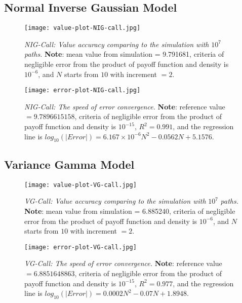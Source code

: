 \subsection{Normal Inverse Gaussian Model}
\begin{figure}[H]
    \centering
    \texttt{[image: value-plot-NIG-call.jpg]}
     \caption[\emph{NIG-Call: Value accuracy comparing to the simulation with} $10^7$ \emph{paths.}]{\emph{NIG-Call: Value accuracy comparing to the simulation with} $10^7$ \emph{paths.} \textbf{Note}: mean value from simulation = 9.791681, criteria of negligible error from the product of payoff function and density is $10^{-6}$, and $N$ starts from $10$  with increment $=2$.}

    \label{fig:label}
\end{figure}
\begin{figure}[H]
    \centering
    \texttt{[image: error-plot-NIG-call.jpg]}
    \caption[\emph{NIG-Call: The speed of error convergence.}]{\emph{NIG-Call: The speed of error convergence.} \textbf{Note}: reference value $=9.7896615158$, criteria of negligible error from the product of payoff function and density is $10^{-15}$, $R^2=0.991$, and the regression line is $log_{10}\left(|Error|\right) = 6.167\times 10^{-6}N^2-0.0562N+5.1576$.}
 
    \label{fig:label}
\end{figure}



\subsection{Variance Gamma Model}
\begin{figure}[H]
    \centering
    \texttt{[image: value-plot-VG-call.jpg]}
    \caption[\emph{VG-Call: Value accuracy comparing to the simulation with} $10^7$ \emph{paths.}]{\emph{VG-Call: Value accuracy comparing to the simulation with} $10^7$ \emph{paths.} \textbf{Note}: mean value from simulation = 6.885240, criteria of negligible error from the product of payoff function and density is $10^{-6}$, and $N$ starts from $10$  with increment $=2$.}
    
    \label{fig:label}
\end{figure}
\begin{figure}[H]
    \centering
    \texttt{[image: error-plot-VG-call.jpg]}
    \caption[\emph{VG-Call: The speed of error convergence.}]{\emph{VG-Call: The speed of error convergence.} \textbf{Note}: reference value $=6.8851648863$, criteria of negligible error from the product of payoff function and density is $10^{-15}$, $R^2=0.977$, and the regression line is $log_{10}\left(|Error|\right) = 0.0002N^2-0.07N+1.8948$.}

    \label{fig:label}
\end{figure}

